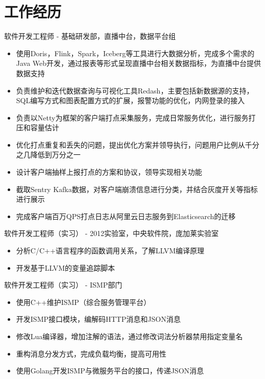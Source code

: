 \documentclass{resume}
\begin{document}
\section{工作经历}
软件开发工程师 - 基础研发部，直播中台，数据平台组
\begin{itemize}[parsep=0.25ex]
    \item 使用Doris，Flink，Spark，Iceberg等工具进行大数据分析，完成多个需求的Java Web开发，通过报表等形式呈现直播中台相关数据指标，为直播中台提供数据支持
    \item 负责维护和迭代数据查询与可视化工具Redash，主要包括新数据源的支持，SQL编写方式和图表配置方式的扩展，报警功能的优化，内网登录的接入
    \item 负责以Netty为框架的客户端打点采集服务，完成日常服务优化，进行服务打压和容量估计
    \item 优化打点重复和丢失的问题，提出优化方案并领导执行，问题用户比例从千分之几降低到万分之一
    \item 设计客户端抽样上报打点的方案和协议，领导实现相关功能
    \item 截取Sentry Kafka数据，对客户端崩溃信息进行分类，并结合灰度开关等指标进行展示
    \item 完成客户端百万QPS打点日志从阿里云日志服务到Elasticsearch的迁移
\end{itemize}
软件开发工程师（实习） - 2012实验室，中央软件院，庞加莱实验室
\begin{itemize}[parsep=0.25ex]
    \item 分析C/C++语言程序的函数调用关系，了解LLVM编译原理
    \item 开发基于LLVM的变量追踪脚本
\end{itemize}
软件开发工程师（实习） - ISMP部门
\begin{itemize}[parsep=0.25ex]
    \item 使用C++维护ISMP（综合服务管理平台）
    \item 开发ISMP接口模块，编解码HTTP消息和JSON消息
    \item 修改Lua编译器，增加注解的语法，通过修改词法分析器禁用指定变量名
    \item 重构消息分发方式，完成负载均衡，提高可用性
    \item 使用Golang开发ISMP与微服务平台的接口，传递JSON消息
\end{itemize}

\vspace{6pt}
\end{document}
